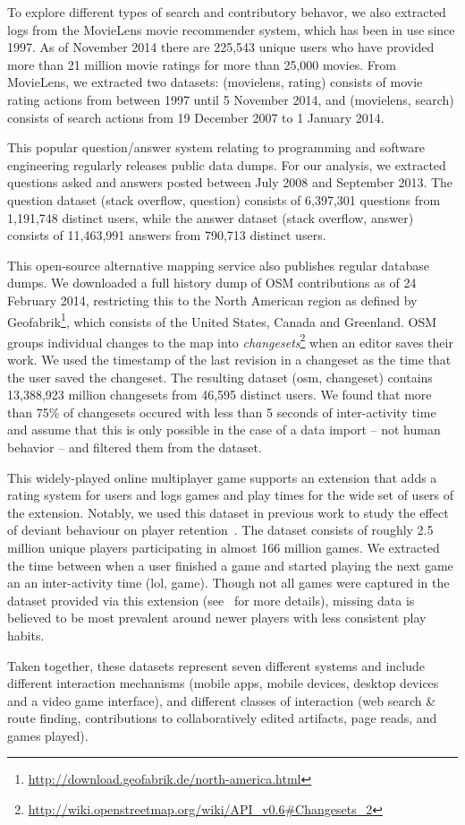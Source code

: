  To explore different types of search and contributory behavor, we also extracted logs from the MovieLens movie recommender system, which has been in use since 1997. As of November 2014 there are 225,543 unique users who have provided more than 21 million movie ratings for more than 25,000 movies. From MovieLens, we extracted two datasets: (movielens, rating) consists of movie rating actions from between 1997 until 5 November 2014, and (movielens, search) consists of search actions from 19 December 2007 to 1 January 2014.

 This popular question/answer system relating to programming and software engineering regularly releases public data dumps. For our analysis, we extracted questions asked and answers posted between July 2008 and September 2013. The question dataset (stack overflow, question) consists of 6,397,301 questions from 1,191,748 distinct users, while the answer dataset (stack overflow, answer) consists of 11,463,991 answers from 790,713 distinct users.

 This open-source alternative mapping service also publishes regular database dumps. We downloaded a full history dump of OSM contributions as of 24 February 2014, restricting this to the North American region as defined by Geofabrik\footnote{\url{http://download.geofabrik.de/north-america.html}}, which consists of the United States, Canada and Greenland. OSM groups individual changes to the map into \textit{changesets}\footnote{\url{http://wiki.openstreetmap.org/wiki/API_v0.6#Changesets_2}} when an editor saves their work. We used the timestamp of the last revision in a changeset as the time that the user saved the changeset. The resulting dataset (osm, changeset) contains 13,388,923 million changesets from 46,595 distinct users.  We found that more than 75\% of changesets occured with less than 5 seconds of inter-activity time and assume that this is only possible in the case of a data import -- not human behavior -- and filtered them from the dataset.

 This widely-played online multiplayer game supports an extension that adds a rating system for users and logs games and play times for the wide set of users of the extension.  Notably, we used this dataset in previous work to study the effect of deviant behaviour on player retention~\cite{shores2014identification}. The dataset consists of roughly 2.5 million unique players participating in almost 166 million games.  We extracted the time between when a user finished a game and started playing the next game an an inter-activity time (lol, game). Though not all games were captured in the dataset provided via this extension (see~\cite{shores2014identification} for more details), missing data is believed to be most prevalent around newer players with less consistent play habits.

Taken together, these datasets represent seven different systems and include different interaction mechanisms (mobile apps, mobile devices, desktop devices and a video game interface), and different classes of interaction (web search \& route finding, contributions to collaboratively edited artifacts, page reads, and games played).
